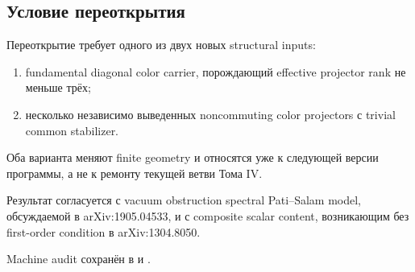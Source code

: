 \subsection{Условие переоткрытия}

Переоткрытие требует одного из двух новых structural inputs:
\begin{enumerate}
 \item fundamental diagonal color carrier, порождающий effective projector
 rank не меньше трёх;
 \item несколько независимо выведенных noncommuting color projectors с
 trivial common stabilizer.
\end{enumerate}
Оба варианта меняют finite geometry и относятся уже к следующей версии
программы, а не к ремонту текущей ветви Тома IV.

Результат согласуется с vacuum obstruction spectral Pati--Salam model,
обсуждаемой в arXiv:1905.04533, и с composite scalar content, возникающим
без first-order condition в arXiv:1304.8050.

Machine audit сохранён в
 и
.